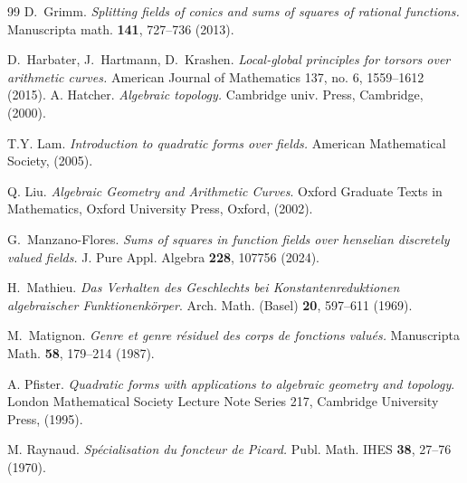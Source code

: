 \begin{thebibliography}{99}
 D.~Grimm. \textit{Splitting fields of conics and sums of squares of rational functions.} Manuscripta math. {\bf 141}, 727--736 (2013).







 D.~Harbater, J.~Hartmann, D.~Krashen. \textit{Local-global principles for torsors over arithmetic curves.} American Journal of Mathematics 137, no. 6, 1559--1612 (2015).
A. Hatcher. \textit{Algebraic topology.}  Cambridge univ. Press, Cambridge, (2000).



T.Y. Lam. \textit{Introduction to quadratic forms over fields.} American
  Mathematical Society, (2005).

 Q. Liu. 
\textit{Algebraic Geometry and Arithmetic Curves}. Oxford Graduate Texts in Mathematics, Oxford University Press, Oxford, (2002).

 G.~Manzano-Flores. \textit{Sums of squares in function fields over henselian discretely valued fields.} J. Pure Appl. Algebra \textbf{228}, 107756 (2024).











H.~Mathieu. \textit{Das {V}erhalten des {G}eschlechts bei {K}onstantenreduktionen
              algebraischer {F}unktionenk\"{o}rper}. Arch. Math. (Basel) {\bf 20}, 597--611 (1969).

M.~Matignon. \textit{
Genre et genre r\'esiduel des corps de fonctions valu\'es.} Manuscripta Math. {\bf 58}, 179--214 (1987). 

 A. Pfister.
\textit{Quadratic forms with applications to algebraic geometry and topology}.
London Mathematical Society Lecture Note Series 217, Cambridge University Press, (1995).





M. Raynaud. \textit{Sp\'ecialisation du foncteur de Picard.} Publ. Math. IHES \textbf{38},
27--76 (1970).


\end{thebibliography}
